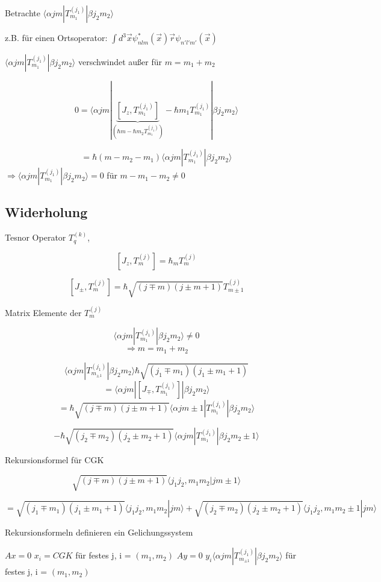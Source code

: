Betrachte \(\langle \alpha jm|T^{(j_1)}_{m_1}|\beta j_2 m_2\rangle \)

z.B. für einen Ortsoperator: \(\int d^3\vec x \psi^*_{nlm}(\vec x) \vec r \psi_{n'l'm'}(\vec x) \)

 \(\langle \alpha jm|T^{(j_1)}_{m_1}|\beta j_2 m_2\rangle \) verschwindet außer für \(m=m_1+m_2\)

\[ 0 = \langle \alpha jm| \underbrace{[J_z, T^{(j_1)}_{m_1}]}_{(\hbar m- \hbar m_2T^{(j_1)}_{m_1})}-\hbar m_1
T^{(j_1)}_{m_1} |\beta j_2 m_2\rangle
\]

\[ = \hbar (m - m_2-m_1)\langle \alpha jm| T^{(j_1)}_{m_1}|\beta j_2 m_2\rangle \]
\(\Rightarrow \langle \alpha jm|T^{(j_1)}_{m_1}|\beta j_2 m_2\rangle = 0\) für \(m-m_1-m_2\neq 0\)



\subsection{Widerholung}

Tesnor Operator \(T^{(k)}_q\), 

\[[J_z,T^{(j)}_m]=\hbar_m T^{(j)}_m \]

\[[J_\pm,T^{(j)}_m]=\hbar \sqrt{(j\mp m)(j\pm m+1)} T^{(j)}_{m\pm 1} \]

Matrix Elemente der \(T^{(j)}_m \)

\[\langle \alpha jm|T^{(j_1)}_{m_1}|\beta j_2 m_2\rangle \neq 0\]
\[ \Rightarrow m=m_1+m_2 \]

\[\langle \alpha jm|T^{(j_1)}_{m_{\pm 1}}|\beta j_2 m_2\rangle\hbar\sqrt{(j_1\mp m_1)(j_1\pm m_1+1)} \]
\[ = \langle \alpha jm|[J_\mp,T^{(j_1)}_{m_1}]|\beta j_2 m_2\rangle \] 
\[ = \hbar \sqrt{(j\mp m)(j\pm m+1)}\langle \alpha jm \pm 1|T^{(j_1)}_{m_1}|\beta j_2 m_2\rangle 
\]

\[
- \hbar\sqrt{(j_2 \mp m_2)(j_2 \pm m_2+1)} \langle \alpha jm | T^{(j_1)}_{m_1} | \beta j_2  m_2 \pm 1\rangle
\]

Rekursionsformel für CGK

 \[ \sqrt{(j\mp m)(j\pm m+1)} \langle j_1j_2, m_1m_2| jm\pm 1\rangle\]

\[ =  \sqrt{(j_1\mp m_1)(j_1\pm m_1+1)}\langle j_1j_2, m_1m_2|jm\rangle +  \sqrt{(j_2\mp m_2)(j_2\pm m_2+1)}\langle j_1j_2,
m_1m_2\pm 1| jm\rangle \]

Rekursionsformeln definieren ein Gelichungssystem

\(Ax=0\) \(x_i=CGK\) für festes j, i = \((m_1,m_2)\)
\(Ay=0\) \(y_i\langle \alpha jm|T^{(j_1)}_{m_{\pm 1}}|\beta j_2 m_2\rangle\) für festes j, i = \((m_1,m_2)\)

